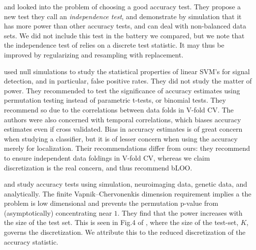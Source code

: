 \documentclass[journal]{IEEEtran}
\begin{document}
\cite{olivetti_induction_2012} and \cite{olivetti_statistical_2014} looked into the problem of choosing a good accuracy test. 
They propose a new test they call an \emph{independence test}, and demonstrate by simulation that it has more power than other accuracy tests, and can deal with non-balanced data sets. 
We did not include this test in the battery we compared, but we note that the independence test of \cite{olivetti_induction_2012} relies on a discrete test statistic. 
It may thus be improved by regularizing and resampling with replacement. 


\cite{schreiber2013statistical} used null simulations to study the statistical properties of linear SVM's for signal detection, and in particular, false positive rates. 
They did not study the matter of power.
They recommended to test the significance of accuracy estimates using permutation testing instead of parametric t-tests, or binomial tests.
They recommend so due to the correlations between data folds in V-fold CV.
The authors were also concerned with temporal correlations, which biases accuracy estimates even if cross validated. 
Bias in accuracy estimates is of great concern when studying a classifier, but it is of lesser concern when using the accuracy merely for localization. 
Their recommendations differ from ours: they recommend to ensure independent data foldings in V-fold CV, whereas we claim discretization is the real concern, and thus recommend bLOO.

\cite{golland_permutation_2003} and \cite{golland_permutation_2005} study accuracy tests using simulation, neuroimaging data, genetic data, and analytically.
The finite Vapnik–Chervonenkis dimension requirement \cite[Sec 4.3]{golland_permutation_2005} implies a the problem is low dimensional and prevents the permutation p-value from (asymptotically) concentrating near $1$. 
They find that the power increases with the size of the test set.
This is seen in Fig.4 of \cite{golland_permutation_2005}, where the size of the test-set, $K$, governs the discretization. 
We attribute this to the reduced discretization of the accuracy statistic.
\end{document}
